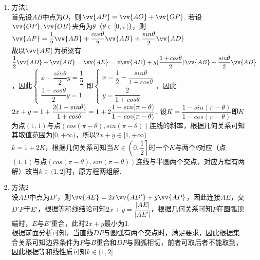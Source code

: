 \begin{enumerate}
\begin{enumerate}
\begin{jieda}
\begin{enumerate}
                \item 方法1 \\
                首先设$AB$中点为$O$，则$\vv{AP} = \vv{AO} + \vv{OP}$. 若设$\vv{OP}, \vv{OB}$夹角为$\theta$（$\theta \in [0, \pi)$），则$\vv{AP} = \dfrac{1}{2}\vv{AB} + \dfrac{cos\theta}{2}\vv{AB} + \dfrac{sin\theta}{2}\vv{AD}$ \\
                故以$\vv{AE}$为桥梁有$\dfrac{1}{2}\vv{AD} + \vv{AB} = \vv{AE} = x \vv{AD} + y(\dfrac{1+cos\theta}{2})\vv{AB} + \dfrac{sin\theta}{2}\vv{AD}$，因此$\left \{ \begin{array}{l}
                     x + \dfrac{sin\theta}{2}y = \dfrac{1}{2}  \\
                     \dfrac{1+cos\theta}{2}y = 1
                \end{array}\right.$即$\left \{ \begin{array}{l}
                     x = \dfrac{1}{2} - \dfrac{sin\theta}{1+cos\theta}  \\
                     y = \dfrac{2}{1+cos\theta} 
                \end{array}\right.$，因此$2x+y = 1 + \dfrac{2(1 - sin\theta)}{1+cos\theta} \\
                = 1 + 2 \dfrac{1 - sin(\pi - \theta)}{1 - cos(\pi - \theta)}$. 设$K = \dfrac{1 - sin(\pi - \theta)}{1 - cos(\pi - \theta)}$即$K$为点$(1, 1)$与点$(cos(\pi - \theta), sin(\pi - \theta))$连线的斜率，根据几何关系可知其取值范围为$[0, +\infty)$，所以$2x+y \in [1, +\infty)$ \\
                $k = 1 + 2K$，根据几何关系可知当$K \in \left(0, \dfrac{1}{2}\right]$时一个$K$与两个$\theta$对应（点$(1, 1)$与点$(cos(\pi - \theta), sin(\pi - \theta))$连线与半圆两个交点，对应方程有两解）故当$k \in (1, 2]$时，原方程两组解.
                \item 方法2 \\
                设$AD$中点为$D'$，则$\vv{AE} = 2x\vv{AD'} + y \vv{AP}$，因此连接$AE$，交$D'P$于$E'$，根据等和线结论可知$2x+y = \dfrac{|AE|}{|AE'|}$，根据几何关系可知$P$在圆弧顶端时，$E$与$E'$重合，此时$2x+y$最小为1. \\
                根据前面分析可知，当直线$DP$与圆弧有两个交点时，满足要求，因此根据集合关系可知边界条件为$P$与$B$重合和$DP$与圆弧相切，前者可取后者不能取到，因此根据等和线性质可知$k \in (1, 2]$
            \end{enumerate}
        \end{jieda}
        

\end{enumerate}
\end{enumerate}

